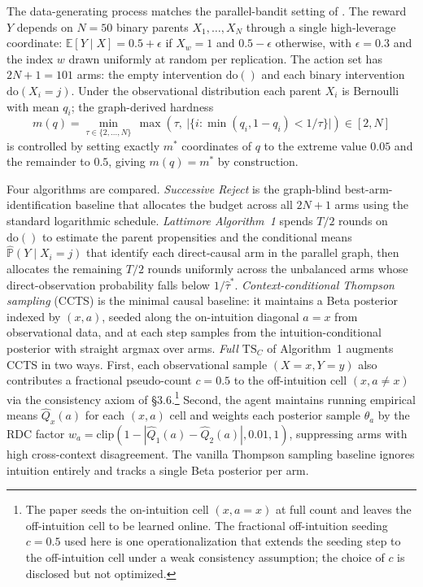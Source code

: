 The data-generating process matches the parallel-bandit setting of \citet[\S3]{lattimore2016causal}. The reward $Y$ depends on $N = 50$ binary parents $X_1, \ldots, X_N$ through a single high-leverage coordinate: $\mathbb{E}[Y \mid X] = 0.5 + \epsilon$ if $X_w = 1$ and $0.5 - \epsilon$ otherwise, with $\epsilon = 0.3$ and the index $w$ drawn uniformly at random per replication. The action set has $2N + 1 = 101$ arms: the empty intervention $\mathrm{do}()$ and each binary intervention $\mathrm{do}(X_i = j)$. Under the observational distribution each parent $X_i$ is Bernoulli with mean $q_i$; the graph-derived hardness
\begin{equation}
m(q) = \min_{\tau \in \{2, \ldots, N\}}\, \max\!\left(\tau,\ \big|\{i : \min(q_i, 1 - q_i) < 1/\tau\}\big|\right) \in [2, N]
\label{eq:simB2_m}
\end{equation}
is controlled by setting exactly $m^*$ coordinates of $q$ to the extreme value $0.05$ and the remainder to $0.5$, giving $m(q) = m^*$ by construction.

Four algorithms are compared. \emph{Successive Reject} \citep[Audibert and Bubeck 2010, as in][]{lattimore2016causal} is the graph-blind best-arm-identification baseline that allocates the budget across all $2N + 1$ arms using the standard logarithmic schedule. \emph{Lattimore Algorithm~1} spends $T/2$ rounds on $\mathrm{do}()$ to estimate the parent propensities and the conditional means $\hat{\mathbb{P}}(Y \mid X_i = j)$ that identify each direct-causal arm in the parallel graph, then allocates the remaining $T/2$ rounds uniformly across the unbalanced arms whose direct-observation probability falls below $1/\hat\tau^*$. \emph{Context-conditional Thompson sampling} (CCTS) is the minimal causal baseline: it maintains a Beta posterior indexed by $(x, a)$, seeded along the on-intuition diagonal $a = x$ from observational data, and at each step samples from the intuition-conditional posterior with straight argmax over arms. \emph{Full $\mathrm{TS}_C$} of \citet{bareinboim2015mabuc} Algorithm~1 augments CCTS in two ways. First, each observational sample $(X = x, Y = y)$ also contributes a fractional pseudo-count $c = 0.5$ to the off-intuition cell $(x, a \neq x)$ via the consistency axiom of \citet{pearl2009causality} \S 3.6.\footnote{The paper seeds the on-intuition cell $(x, a = x)$ at full count and leaves the off-intuition cell to be learned online. The fractional off-intuition seeding $c = 0.5$ used here is one operationalization that extends the seeding step to the off-intuition cell under a weak consistency assumption; the choice of $c$ is disclosed but not optimized.} Second, the agent maintains running empirical means $\hat Q_x(a)$ for each $(x, a)$ cell and weights each posterior sample $\theta_a$ by the RDC factor $w_a = \mathrm{clip}(1 - |\hat Q_1(a) - \hat Q_2(a)|, 0.01, 1)$, suppressing arms with high cross-context disagreement. The vanilla Thompson sampling baseline ignores intuition entirely and tracks a single Beta posterior per arm.

